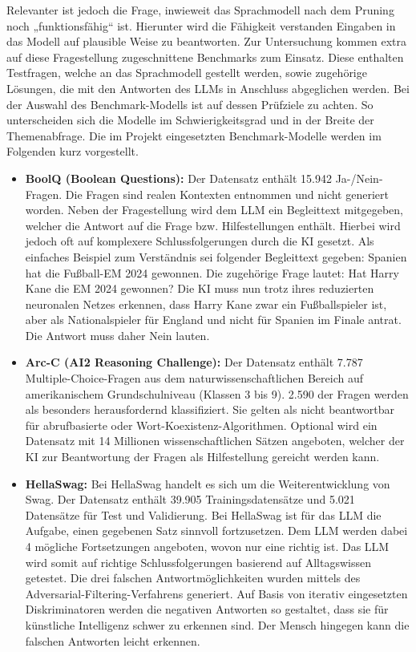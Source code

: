 Relevanter ist jedoch die Frage, inwieweit das Sprachmodell nach dem Pruning
noch „funktionsfähig“ ist. Hierunter wird die Fähigkeit verstanden Eingaben in
das Modell auf plausible Weise zu beantworten. Zur Untersuchung kommen extra
auf diese Fragestellung zugeschnittene Benchmarks zum Einsatz. Diese enthalten
Testfragen, welche an das Sprachmodell gestellt werden, sowie zugehörige
Lösungen, die mit den Antworten des LLMs in Anschluss abgeglichen werden. Bei
der Auswahl des Benchmark-Modells ist auf dessen Prüfziele zu achten. So
unterscheiden sich die Modelle im Schwierigkeitsgrad und in der Breite der
Themenabfrage. Die im Projekt eingesetzten Benchmark-Modelle werden im
Folgenden kurz vorgestellt.


\begin{itemize}
    \item \textbf{BoolQ (Boolean Questions):} Der Datensatz enthält 15.942 Ja-/Nein-Fragen. Die Fragen sind realen Kontexten entnommen und nicht generiert worden. Neben der Fragestellung wird dem LLM ein Begleittext mitgegeben, welcher die Antwort auf die Frage bzw. Hilfestellungen enthält. Hierbei wird jedoch oft auf komplexere Schlussfolgerungen durch die KI gesetzt. Als einfaches Beispiel zum Verständnis sei folgender Begleittext gegeben: Spanien hat die Fußball-EM 2024 gewonnen. Die zugehörige Frage lautet: Hat Harry Kane die EM 2024 gewonnen? Die KI muss nun trotz ihres reduzierten neuronalen Netzes erkennen, dass Harry Kane zwar ein Fußballspieler ist, aber als Nationalspieler für England und nicht für Spanien im Finale antrat. Die Antwort muss daher Nein lauten.\autocite[Vgl.][S. 1-2]{clark2019boolq}
    
    \item \textbf{Arc-C (AI2 Reasoning Challenge):} Der Datensatz enthält 7.787 Multiple-Choice-Fragen aus dem naturwissenschaftlichen Bereich auf amerikanischem Grundschulniveau (Klassen 3 bis 9). 2.590 der Fragen werden als besonders herausfordernd klassifiziert. Sie gelten als nicht beantwortbar für abrufbasierte oder Wort-Koexistenz-Algorithmen. Optional wird ein Datensatz mit 14 Millionen wissenschaftlichen Sätzen angeboten, welcher der KI zur Beantwortung der Fragen als Hilfestellung gereicht werden kann.\autocite[Vgl.][S. 1]{clark2019arc}

    \item \textbf{HellaSwag:} Bei HellaSwag handelt es sich um die Weiterentwicklung von Swag. Der Datensatz enthält 39.905 Trainingsdatensätze und 5.021 Datensätze für Test und Validierung. Bei HellaSwag ist für das LLM die Aufgabe, einen gegebenen Satz sinnvoll fortzusetzen. Dem LLM werden dabei 4 mögliche Fortsetzungen angeboten, wovon nur eine richtig ist. Das LLM wird somit auf richtige Schlussfolgerungen basierend auf Alltagswissen getestet. Die drei falschen Antwortmöglichkeiten wurden mittels des Adversarial-Filtering-Verfahrens generiert. Auf Basis von iterativ eingesetzten Diskriminatoren werden die negativen Antworten so gestaltet, dass sie für künstliche Intelligenz schwer zu erkennen sind. Der Mensch hingegen kann die falschen Antworten leicht erkennen.\autocite[Vgl.][S. 1-3]{zellers2019hellaswag}


\end{itemize}
